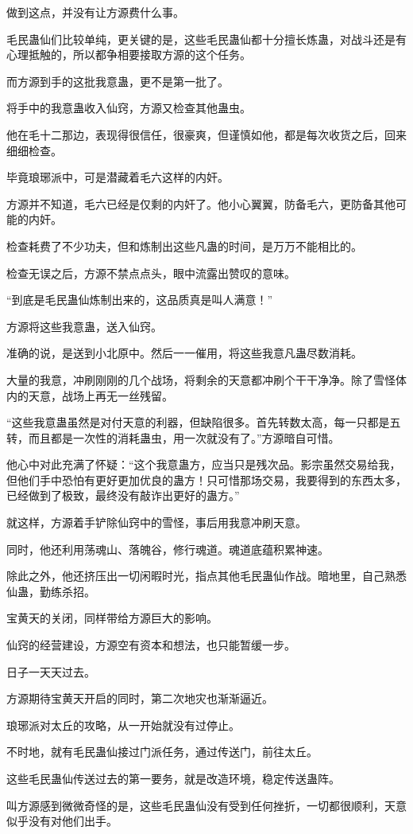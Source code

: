 \begin{this_body}
做到这点，并没有让方源费什么事。

毛民蛊仙们比较单纯，更关键的是，这些毛民蛊仙都十分擅长炼蛊，对战斗还是有心理抵触的，所以都争相要接取方源的这个任务。

而方源到手的这批我意蛊，更不是第一批了。

将手中的我意蛊收入仙窍，方源又检查其他蛊虫。

他在毛十二那边，表现得很信任，很豪爽，但谨慎如他，都是每次收货之后，回来细细检查。

毕竟琅琊派中，可是潜藏着毛六这样的内奸。

方源并不知道，毛六已经是仅剩的内奸了。他小心翼翼，防备毛六，更防备其他可能的内奸。

检查耗费了不少功夫，但和炼制出这些凡蛊的时间，是万万不能相比的。

检查无误之后，方源不禁点点头，眼中流露出赞叹的意味。

“到底是毛民蛊仙炼制出来的，这品质真是叫人满意！”

方源将这些我意蛊，送入仙窍。

准确的说，是送到小北原中。然后一一催用，将这些我意凡蛊尽数消耗。

大量的我意，冲刷刚刚的几个战场，将剩余的天意都冲刷个干干净净。除了雪怪体内的天意，战场上再无一丝残留。

“这些我意蛊虽然是对付天意的利器，但缺陷很多。首先转数太高，每一只都是五转，而且都是一次性的消耗蛊虫，用一次就没有了。”方源暗自可惜。

他心中对此充满了怀疑：“这个我意蛊方，应当只是残次品。影宗虽然交易给我，但他们手中恐怕有更好更加优良的蛊方！只可惜那场交易，我要得到的东西太多，已经做到了极致，最终没有敲诈出更好的蛊方。”

就这样，方源着手铲除仙窍中的雪怪，事后用我意冲刷天意。

同时，他还利用荡魂山、落魄谷，修行魂道。魂道底蕴积累神速。

除此之外，他还挤压出一切闲暇时光，指点其他毛民蛊仙作战。暗地里，自己熟悉仙蛊，勤练杀招。

宝黄天的关闭，同样带给方源巨大的影响。

仙窍的经营建设，方源空有资本和想法，也只能暂缓一步。

日子一天天过去。

方源期待宝黄天开启的同时，第二次地灾也渐渐逼近。

琅琊派对太丘的攻略，从一开始就没有过停止。

不时地，就有毛民蛊仙接过门派任务，通过传送门，前往太丘。

这些毛民蛊仙传送过去的第一要务，就是改造环境，稳定传送蛊阵。

叫方源感到微微奇怪的是，这些毛民蛊仙没有受到任何挫折，一切都很顺利，天意似乎没有对他们出手。

\end{this_body}

